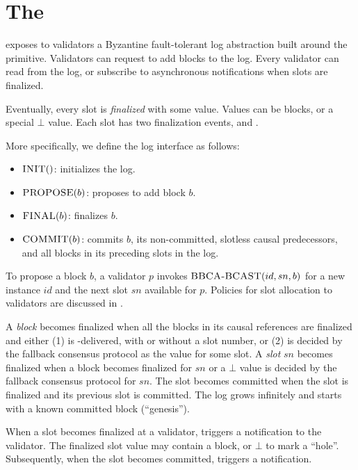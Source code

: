 \section{The \system}
\label{sec:log}
\system exposes to validators a Byzantine fault-tolerant log abstraction built around the \primitive primitive.
Validators can request to add blocks to the log.
Every validator 
can read from the log, or subscribe to asynchronous notifications when slots are finalized. 

Eventually, every slot is \emph{finalized} with some value.
Values can be blocks, or a special $\bot$ value.
Each slot has two finalization events, \commit and \eagercommit. 

More specifically, we define the log interface as follows:
\begin{itemize}
	\item $\textsc{INIT}()$: initializes the log.
	\item $\textsc{PROPOSE}(b)$: proposes to add block $b$.
	\item $\textsc{FINAL}(b)$: finalizes $b$.
	\item $\textsc{COMMIT}(b)$: commits $b$, its non-committed, slotless causal predecessors, and all blocks in its preceding slots in the log.
\end{itemize}

To propose a block $b$, a validator $p$ invokes $\textsc{BBCA-BCAST}(id,sn,b)$ for a new instance $id$ and the next slot $sn$ available for $p$.
Policies for slot allocation to validators are discussed in .


A \emph{block} becomes finalized when all the blocks in its causal references are finalized and either (1) is \primitivesmall-delivered, with or without a slot number, or (2) is decided by the fallback consensus protocol as the value for some slot.
A \emph{slot} $sn$ becomes finalized when a block becomes finalized for $sn$ or a $\bot$ value is decided by the fallback consensus protocol for $sn$. 
The slot becomes committed when the slot is finalized and its previous slot is committed. 
The log grows infinitely and starts with a known committed block (``genesis'').

When a slot becomes finalized at a validator,
\system triggers a \eagercommit notification to the validator. 
The finalized slot value may contain a block, or $\bot$ to mark a ``hole''.
Subsequently, when the slot becomes committed, 
\system triggers a \commit notification.


